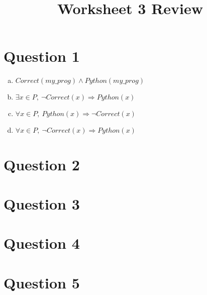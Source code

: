 \documentclass[12pt]{article}
\begin{document}
\title{Worksheet 3 Review}
\maketitle

\section*{Question 1}
\begin{enumerate}[a.]
    \item

    $Correct(my\_prog) \land Python(my\_prog)$

    \item

    $\exists x \in P,\:\neg Correct(x) \Rightarrow Python(x)$

    \item

    $\forall x \in P,\:Python(x) \Rightarrow \neg Correct(x)$

    \item

    $\forall x \in P,\:\neg Correct(x) \Rightarrow Python(x)$

\end{enumerate}

\section*{Question 2}

\section*{Question 3}

\section*{Question 4}

\section*{Question 5}
\end{document}
